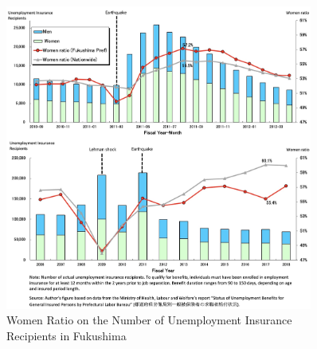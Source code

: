 \documentclass[a4paper,12pt]{article}
\begin{document}


\begin{figure}[h!]
    \centering
    \includegraphics[width=0.9\textwidth]{Number of Actual Unemployment Insurance Recipients2.jpeg}  %
    \caption{Women Ratio on the Number of Unemployment Insurance Recipients in Fukushima}
    \label{fig:women_ratio_fukushima2}
\end{figure}





\end{document}
